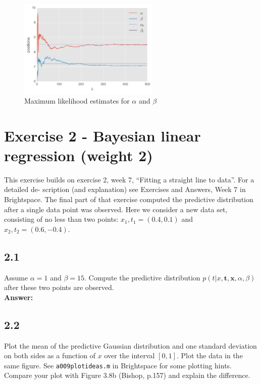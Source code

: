 \documentclass[a4paper]{article}
\begin{document}
\begin{figure}[H]
\center
\includegraphics[width=0.6\textwidth]{Images/1_3_3.png}
\caption{Maximum likelihood estimates for $\alpha$ and $\beta$}
\label{fig:133}
\end{figure}

\section*{Exercise 2 - Bayesian linear regression (weight 2)}

This exercise builds on exercise 2, week 7, “Fitting a straight line to data”. For a detailed de- scription (and explanation) see Exercises and Answers, Week 7 in Brightspace. The final part of that exercise computed the predictive distribution after a single data point was observed. Here we consider a new data set, consisting of no less than two points: ${x_1,t_1} = (0.4,0.1)$ and ${x_2, t_2} = (0.6, -0.4)$.


\subsection*{2.1}

Assume $\alpha = 1$ and $\beta = 15$. Compute the predictive distribution $p(t|x, \textbf{t}, \textbf{x}, \alpha, \beta)$ after these two points are observed.\\

\textbf{Answer:}\\


\subsection*{2.2}


Plot the mean of the predictive Gaussian distribution and one standard deviation on both sides as a function of $x$ over the interval $[0,1]$. Plot the data in the same figure. See \texttt{a009plotideas.m} in Brightspace for some plotting hints. Compare your plot with Figure 3.8b (Bishop, p.157) and explain the difference.\\
\end{document}
